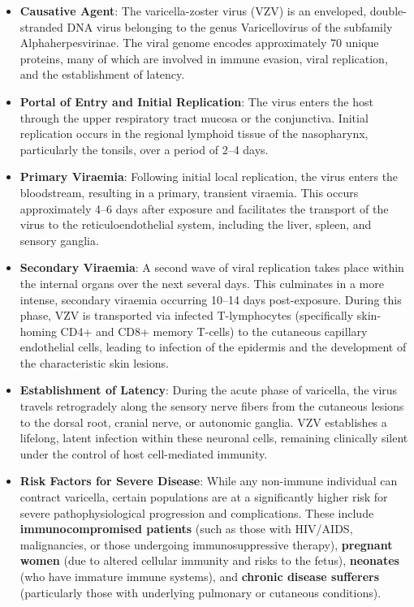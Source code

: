 \begin{itemize}
    \item \textbf{Causative Agent}: The varicella-zoster virus (VZV) is an enveloped, double-stranded DNA virus belonging to the genus Varicellovirus of the subfamily Alphaherpesvirinae. The viral genome encodes approximately 70 unique proteins, many of which are involved in immune evasion, viral replication, and the establishment of latency.
    \item \textbf{Portal of Entry and Initial Replication}: The virus enters the host through the upper respiratory tract mucosa or the conjunctiva. Initial replication occurs in the regional lymphoid tissue of the nasopharynx, particularly the tonsils, over a period of 2--4 days.
    \item \textbf{Primary Viraemia}: Following initial local replication, the virus enters the bloodstream, resulting in a primary, transient viraemia. This occurs approximately 4--6 days after exposure and facilitates the transport of the virus to the reticuloendothelial system, including the liver, spleen, and sensory ganglia.
    \item \textbf{Secondary Viraemia}: A second wave of viral replication takes place within the internal organs over the next several days. This culminates in a more intense, secondary viraemia occurring 10--14 days post-exposure. During this phase, VZV is transported via infected T-lymphocytes (specifically skin-homing CD4+ and CD8+ memory T-cells) to the cutaneous capillary endothelial cells, leading to infection of the epidermis and the development of the characteristic skin lesions.
    \item \textbf{Establishment of Latency}: During the acute phase of varicella, the virus travels retrogradely along the sensory nerve fibers from the cutaneous lesions to the dorsal root, cranial nerve, or autonomic ganglia. VZV establishes a lifelong, latent infection within these neuronal cells, remaining clinically silent under the control of host cell-mediated immunity.
    \item \textbf{Risk Factors for Severe Disease}: While any non-immune individual can contract varicella, certain populations are at a significantly higher risk for severe pathophysiological progression and complications. These include \textbf{immunocompromised patients} (such as those with HIV/AIDS, malignancies, or those undergoing immunosuppressive therapy), \textbf{pregnant women} (due to altered cellular immunity and risks to the fetus), \textbf{neonates} (who have immature immune systems), and \textbf{chronic disease sufferers} (particularly those with underlying pulmonary or cutaneous conditions).
\end{itemize}


